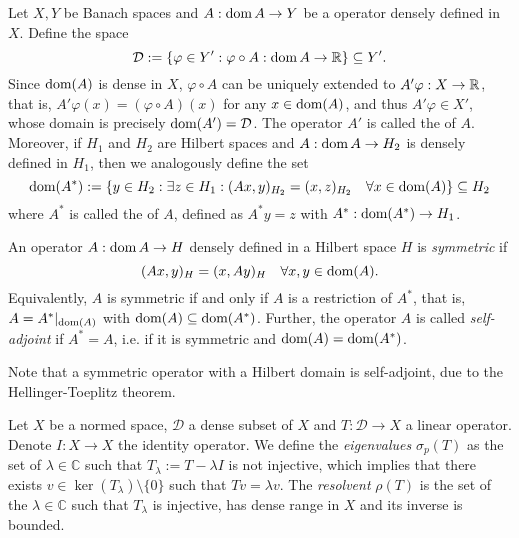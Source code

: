 \begin{definition}
    Let $X, Y$ be Banach spaces and $A:\operatorname{\text{dom}} A \to Y$ be a operator densely defined in $X$. Define the space
    \begin{equation*}
        \mathcal{D} := \{\varphi\in Y': \varphi\circ A:\operatorname{\text{dom}} A\to \mathbb{R} \}\subseteq Y'.
    \end{equation*}
    Since $\operatorname{\text{dom}}(A)$ is dense in $X$, $\varphi\circ A$ can be uniquely extended to $A'\varphi:X\to \mathbb{R}$, that is, $A'\varphi(x) = (\varphi\circ A)(x)$ for any $x\in\operatorname{\text{dom}}(A)$, and thus $A'\varphi\in X'$, whose domain is precisely $\operatorname{\text{dom}}(A') = \mathcal{D}$. The operator $A'$ is called the  of $A$. Moreover, if $H_1$ and $H_2$ are Hilbert spaces and $A:\operatorname{\text{dom}} A\to H_2$ is densely defined in $H_1$, then we analogously define the set 
    \begin{equation*}
        \operatorname{\text{dom}}(A^*) := \{y\in H_2: \exists z\in H_1: (Ax,y)_{H_2} = (x,z)_{H_2}\quad \forall x\in\operatorname{\text{dom}}(A)\}\subseteq H_2
    \end{equation*}
    where $A^*$ is called the  of $A$, defined as $A^*y = z$ with $A^*:\operatorname{\text{dom}}(A^*)\to H_1$.
\end{definition}
\begin{definition}
    An operator $A:\operatorname{\text{dom}} A\to H$ densely defined in a Hilbert space $H$ is \textit{symmetric} if 
    \begin{equation*}
        (Ax,y)_H = (x,Ay)_H \quad \forall x,y\in\operatorname{\text{dom}}(A).
    \end{equation*}
    Equivalently, $A$ is symmetric if and only if $A$ is a restriction of $A^*$, that is, $A=A^*|_{\operatorname{\text{dom}}(A)}$ with $\operatorname{\text{dom}}(A)\subseteq \operatorname{\text{dom}}(A^*)$. Further, the operator $A$ is called \textit{self-adjoint} if $A^*=A$, i.e. if it is symmetric and $\operatorname{\text{dom}}(A) = \operatorname{\text{dom}}(A^*)$.  
\end{definition}
Note that a symmetric operator with a Hilbert domain is self-adjoint, due to the Hellinger-Toeplitz theorem.

\begin{definition} 
    Let $X$ be a normed space, $\mathcal{D}$ a dense subset of $X$ and $T:\mathcal{D}\to X$ a linear operator. Denote $I:X\to X$ the identity operator. We define the \textit{eigenvalues} $\sigma_p(T)$ as the set of $\lambda\in\mathbb{C}$ such that $T_\lambda := T - \lambda I$ is not injective, which implies that there exists $v\in \ker(T_\lambda)\setminus \{0\}$ such that $Tv=\lambda v$. The \textit{resolvent} $\rho(T)$ is the set of the $\lambda\in\mathbb{C}$ such that $T_\lambda$ is injective, has dense range in $X$ and its inverse is bounded.
\end{definition}

